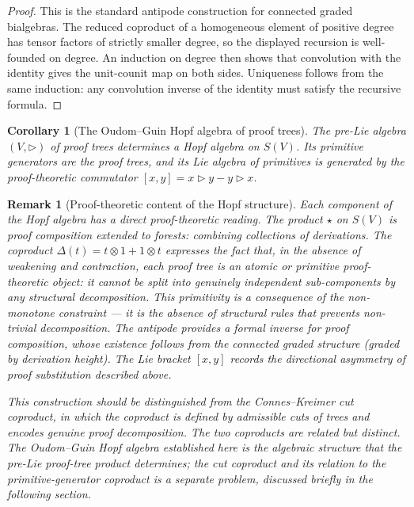 \documentclass[11pt]{article}
\newtheorem{corollary}[theorem]{Corollary}
\newtheorem{remark}[theorem]{Remark}
\begin{document}
\begin{proof}
This is the standard antipode construction for connected graded bialgebras.
The reduced coproduct of a homogeneous element of positive degree has tensor
factors of strictly smaller degree, so the displayed recursion is well-founded
on degree.  An induction on degree then shows that convolution with the
identity gives the unit-counit map on both sides.  Uniqueness follows from the
same induction: any convolution inverse of the identity must satisfy the
recursive formula.
\end{proof}

\begin{corollary}[The Oudom--Guin Hopf algebra of proof trees]\label{cor:hopf}
The pre-Lie algebra \((V,\triangleright)\) of proof trees determines a Hopf
algebra on \(S(V)\).  Its primitive generators are the proof trees, and its
Lie algebra of primitives is generated by the proof-theoretic commutator
\([x,y]=x\triangleright y-y\triangleright x\).
\end{corollary}

\begin{remark}[Proof-theoretic content of the Hopf structure]
Each component of the Hopf algebra has a direct proof-theoretic reading.
The \emph{product} \(\star\) on \(S(V)\) is proof composition extended to
forests: combining collections of derivations.  The \emph{coproduct}
\(\Delta(t)=t\otimes 1+1\otimes t\) expresses the fact that, in the absence
of weakening and contraction, each proof tree is an \emph{atomic} or
\emph{primitive} proof-theoretic object: it cannot be split into genuinely
independent sub-components by any structural decomposition.  This
primitivity is a consequence of the non-monotone constraint --- it is the
absence of structural rules that prevents non-trivial decomposition.  The
\emph{antipode} provides a formal inverse for proof composition, whose
existence follows from the connected graded structure (graded by derivation
height).  The \emph{Lie bracket} \([x,y]\) records the directional
asymmetry of proof substitution described above.

This construction should be distinguished from the Connes--Kreimer cut
coproduct, in which the coproduct is defined by admissible cuts of trees
and encodes genuine proof decomposition.  The two coproducts are related
but distinct.  The Oudom--Guin Hopf algebra established here is the
algebraic structure that the pre-Lie proof-tree product determines; the
cut coproduct and its relation to the primitive-generator coproduct is a
separate problem, discussed briefly in the following section.
\end{remark}
\end{document}
